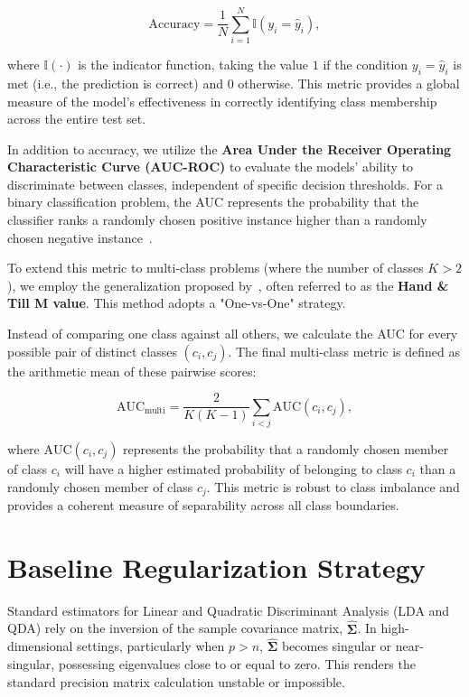 \documentclass[a4paper,11pt,twoside]{report}
\theoremstyle{definition}
\begin{document}
\begin{equation}
    \text{Accuracy} = \frac{1}{N} \sum_{i=1}^{N} \mathbb{I}(y_i = \hat{y}_i),
\end{equation}

\noindent where $\mathbb{I}(\cdot)$ is the indicator function, taking the value $1$ if the condition $y_i = \hat{y}_i$ is met (i.e., the prediction is correct) and $0$ otherwise. This metric provides a global measure of the model's effectiveness in correctly identifying class membership across the entire test set.

In addition to accuracy, we utilize the \textbf{Area Under the Receiver Operating Characteristic Curve (AUC-ROC)} to evaluate the models' ability to discriminate between classes, independent of specific decision thresholds. For a binary classification problem, the AUC represents the probability that the classifier ranks a randomly chosen positive instance higher than a randomly chosen negative instance~\cite{fawcett2006introduction}.

To extend this metric to multi-class problems (where the number of classes $K > 2$), we employ the generalization proposed by~\cite{hand2001simple}, often referred to as the \textbf{Hand \& Till M value}. This method adopts a "One-vs-One" strategy.

Instead of comparing one class against all others, we calculate the AUC for every possible pair of distinct classes $(c_i, c_j)$. The final multi-class metric is defined as the arithmetic mean of these pairwise scores:

\begin{equation}
    \text{AUC}_{\text{multi}} = \frac{2}{K(K-1)} \sum_{i < j} \text{AUC}(c_i, c_j),
\end{equation}

\noindent where $\text{AUC}(c_i, c_j)$ represents the probability that a randomly chosen member of class $c_i$ will have a higher estimated probability of belonging to class $c_i$ than a randomly chosen member of class $c_j$. This metric is robust to class imbalance and provides a coherent measure of separability across all class boundaries.
\section{Baseline Regularization Strategy}
\label{sec:baseline_regularization}

Standard estimators for Linear and Quadratic Discriminant Analysis (LDA and QDA) rely on the inversion of the sample covariance matrix, $\hat{\boldsymbol{\Sigma}}$. In high-dimensional settings, particularly when $p > n$, $\hat{\boldsymbol{\Sigma}}$ becomes singular or near-singular, possessing eigenvalues close to or equal to zero. This renders the standard precision matrix calculation unstable or impossible.
\end{document}
